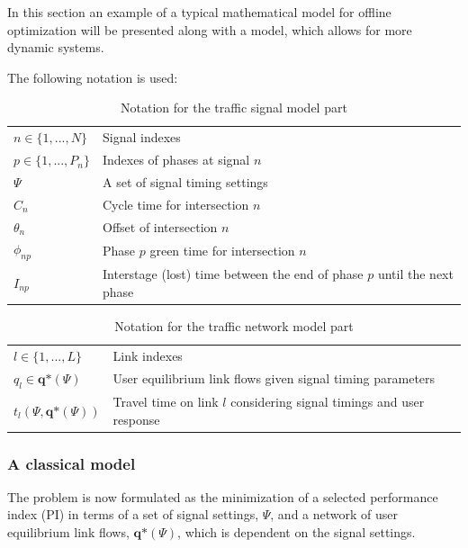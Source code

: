 \label{model}
In this section an example of a typical mathematical model for offline optimization will be presented along with a model, which allows for more dynamic systems.

The following notation is used:

\begin{table}[!ht]
\begin{center}
\begin{tabular}{ll}
\hline
$n \in \lbrace 1,...,N \rbrace$ & Signal indexes \\
$p \in \lbrace 1,...,P_n \rbrace$ & Indexes of phases at signal $n$ \\ 
$\Psi$ & A set of signal timing settings \\
$C_n$ & Cycle time for intersection $n$ \\
$\theta_n$ & Offset of intersection $n$ \\
$\phi_{np}$ & Phase $p$ green time for intersection $n$  \\
$I_{np}$ & Interstage (lost) time between the end of phase $p$ until the next phase  \\
\hline
\end{tabular}
\end{center}
\caption{Notation for the traffic signal model part}
\end{table}

\begin{table}[!ht]
\begin{center}
\begin{tabular}{ll}
\hline
$l \in \lbrace 1,...,L \rbrace$ & Link indexes \\
$q_l \in \textbf{q*}(\Psi)$ & User equilibrium link flows given signal timing parameters  \\
$t_l(\Psi,\textbf{q*}(\Psi))$ & Travel time on link $l$ considering signal timings and user response \\
\hline
\end{tabular}
\end{center}
\caption{Notation for the traffic network model part}
\end{table}

\subsubsection*{A classical model}

The problem is now formulated as the minimization of a selected performance index (PI) in terms of a set of signal settings, $\Psi$, and a network of user equilibrium link flows, $\textbf{q*}(\Psi)$, which is dependent on the signal settings.

